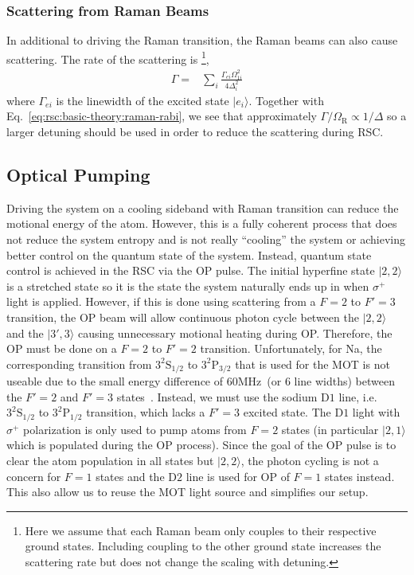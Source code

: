 \subsubsection{Scattering from Raman Beams}
\label{ch:rsc:basic-theory:raman-scatter}

In additional to driving the Raman transition, the Raman beams can also cause scattering.
The rate of the scattering is
\footnote{Here we assume that each Raman beam only couples to their respective ground states.
  Including coupling to the other ground state increases the scattering rate but does not change
  the scaling with detuning.},
\begin{align*}
  \Gamma=&\sum_{i}\frac{\Gamma_{ei}\Omega_{1i}^2}{4\Delta_i^2}
\end{align*}
where $\Gamma_{ei}$ is the linewidth of the excited state $|e_i\rangle$.
Together with Eq.~\ref{eq:rsc:basic-theory:raman-rabi}, we see that approximately
$\Gamma/\Omega_{\mathrm{R}}\propto1/\Delta$ so a larger detuning should be used
in order to reduce the scattering during RSC.

\subsection{Optical Pumping}
\label{ch:rsc:basic-theory:op}

Driving the system on a cooling sideband with Raman transition can reduce the
motional energy of the atom. However, this is a fully coherent process that does
not reduce the system entropy and is not really ``cooling'' the system
or achieving better control on the quantum state of the system.
Instead, quantum state control is achieved in the RSC via the OP pulse.
The initial hyperfine state $|2,2\rangle$ is a stretched state so it is the
state the system naturally ends up in when $\sigma^+$ light is applied.
However, if this is done using scattering from a $F=2$ to $F'=3$ transition,
the OP beam will allow continuous photon cycle
between the $|2,2\rangle$ and the $|3',3\rangle$ causing unnecessary motional heating during OP.
Therefore, the OP must be done on a $F=2$ to $F'=2$ transition.
Unfortunately, for Na, the corresponding transition
from $\mathrm{3^2S_{1/2}}$ to $\mathrm{3^2P_{3/2}}$
that is used for the MOT is not useable due to the small energy difference of
$60 \mathrm{MHz}$~(or $6$ line widths) between the $F'=2$ and
$F'=3$ states~\cite{steck_sodium_nodate}.
Instead, we must use the sodium $\mathrm{D1}$ line,
i.e. $\mathrm{3^2S_{1/2}}$ to $\mathrm{3^2P_{1/2}}$ transition,
which lacks a $F'=3$ excited state.
The $\mathrm{D1}$ light with $\sigma^+$ polarization is only used to pump atoms from
$F=2$ states (in particular $|2,1\rangle$ which is populated during the OP process).
Since the goal of the OP pulse is to clear the atom population in all states but $|2,2\rangle$,
the photon cycling is not a concern for $F=1$ states and the $\mathrm{D2}$ line
is used for OP of $F=1$ states instead.
This also allow us to reuse the MOT light source and simplifies our setup.

